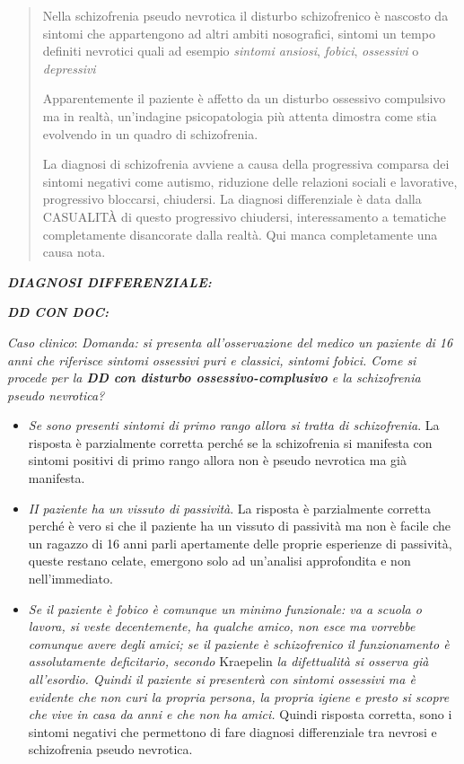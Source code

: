 \documentclass[]{article}
\begin{document}
\begin{quote}
Nella schizofrenia pseudo nevrotica il disturbo schizofrenico è nascosto
da sintomi che appartengono ad altri ambiti nosografici, sintomi un
tempo definiti nevrotici quali ad esempio \emph{sintomi ansiosi},
\emph{fobici}, \emph{ossessivi} o \emph{depressivi}

Apparentemente il paziente è affetto da un disturbo ossessivo compulsivo
ma in realtà, un'indagine psicopatologia più attenta dimostra come stia
evolvendo in un quadro di schizofrenia.

La diagnosi di schizofrenia avviene a causa della progressiva comparsa
dei sintomi negativi come autismo, riduzione delle relazioni sociali e
lavorative, progressivo bloccarsi, chiudersi. La diagnosi differenziale
è data dalla CASUALITÀ di questo progressivo chiudersi, interessamento a
tematiche completamente disancorate dalla realtà. Qui manca
completamente una causa nota.
\end{quote}

\textbf{\emph{DIAGNOSI DIFFERENZIALE:}}

\textbf{\emph{DD CON DOC:}}

\emph{Caso clinico}: \emph{Domanda: si presenta all'osservazione del
medico un paziente di 16 anni che riferisce sintomi ossessivi puri e
classici, sintomi fobici. Come si procede per la \textbf{\emph{DD con
disturbo ossessivo-complusivo}} e la schizofrenia pseudo nevrotica? }

\begin{itemize}
\item
  \emph{Se sono presenti sintomi di primo rango allora si tratta di
  schizofrenia}. La risposta è parzialmente corretta perché se la
  schizofrenia si manifesta con sintomi positivi di primo rango allora
  non è pseudo nevrotica ma già manifesta.
\item
  \emph{II paziente ha un vissuto di passività}. La risposta è
  parzialmente corretta perché è vero si che il paziente ha un vissuto
  di passività ma non è facile che un ragazzo di 16 anni parli
  apertamente delle proprie esperienze di passività, queste restano
  celate, emergono solo ad un'analisi approfondita e non nell'immediato.
\item
  \emph{Se il paziente è fobico è comunque un minimo funzionale: va a
  scuola o lavora, si veste decentemente, ha qualche amico, non esce ma
  vorrebbe comunque avere degli amici; se il paziente è schizofrenico il
  funzionamento è assolutamente deficitario, secondo} Kraepelin \emph{la
  difettualità si osserva già all'esordio. Quindi il paziente si
  presenterà con sintomi ossessivi ma è evidente che non curi la propria
  persona, la propria igiene e presto si scopre che vive in casa da anni
  e che non ha amici.} Quindi risposta corretta, sono i sintomi negativi
  che permettono di fare diagnosi differenziale tra nevrosi e
  schizofrenia pseudo nevrotica.
\end{itemize}
\end{document}
